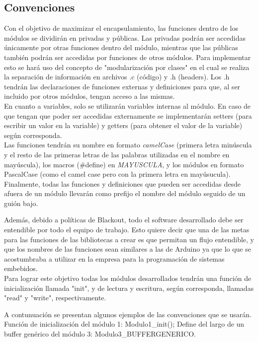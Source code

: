 \subsection{Convenciones}
Con el objetivo de maximizar el encapsulamiento, las funciones dentro de los módulos se dividirán en privadas y públicas. Las privadas podrán ser accedidas únicamente por otras funciones dentro del módulo, mientras que las públicas también podrán ser accedidas por funciones de otros módulos. Para implementar esto se hará uso del concepto de "modularización por clases" \cite{sec2_6_2-1} en el cual se realiza la separación de información en archivos .c (código) y .h (headers). Los .h tendrán las declaraciones de funciones externas y definiciones para que, al ser incluido por otros módulos, tengan acceso a las mismas.\\
En cuanto a variables, solo se utilizarán variables internas al módulo. En caso de que tengan que poder ser accedidas externamente se implementarán setters (para escribir un valor en la variable) y getters (para obtener el valor de la variable) según corresponda.\\
Las funciones tendrán su nombre en formato \textit{camelCase} (primera letra minúscula y el resto de las primeras letras de las palabras utilizadas en el nombre en mayúscula), los macros (\#define) en \textit{MAYUSCULA}, y los módulos en formato PascalCase (como el camel case pero con la primera letra en mayúsucula).
Finalmente, todas las funciones y definiciones que pueden ser accedidas desde afuera de un módulo llevarán como prefijo el nombre del módulo seguido de un guión bajo. 

Además, debido a políticas de Blackout, todo el software desarrollado debe ser entendible por todo el equipo de trabajo. Esto quiere decir que una de las metas para las funciones de las bibliotecas a crear es que permitan un flujo entendible, y que los nombres de las funciones sean similares a las de Arduino ya que lo que se acostumbraba a utilizar en la empresa para la programación de sistemas embebidos.\\
Para lograr este objetivo todas los módulos desarrollados tendrán una función de inicialización llamada "init", y de lectura y escritura, según corresponda, llamadas "read" y "write", respectivamente. 

A contunuación se presentan algunos ejemplos de las convenciones que se usarán. Función de inicialización del módulo 1: Modulo1\_init(); Define del largo de un buffer genérico del módulo 3: Modulo3\_BUFFERGENERICO.


